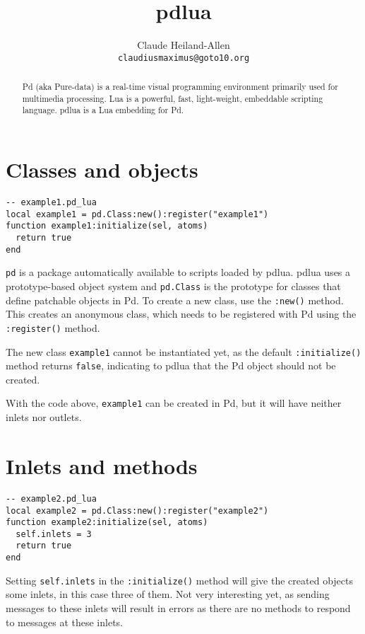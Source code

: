 \documentclass{article}
\title{pdlua}
\author{Claude Heiland-Allen
\\
\tt{claudiusmaximus@goto10.org}}
\begin{document}
\maketitle

\begin{abstract}
Pd (aka Pure-data) is a real-time visual programming environment
primarily used for multimedia processing. Lua is a powerful, fast,
light-weight, embeddable scripting language. pdlua is a Lua embedding
for Pd.
\end{abstract}

\section{Classes and objects}

\begin{verbatim}
-- example1.pd_lua
local example1 = pd.Class:new():register("example1")
function example1:initialize(sel, atoms)
  return true
end
\end{verbatim}

{\tt pd} is a package automatically available to scripts loaded by pdlua.
pdlua uses a prototype-based object system and {\tt pd.Class} is the
prototype for classes that define patchable objects in Pd.  To create a
new class, use the {\tt :new()} method.  This creates an anonymous class,
which needs to be registered with Pd using the {\tt :register()} method.

The new class {\tt example1} cannot be instantiated yet, as the default
{\tt :initialize()} method returns {\tt false}, indicating to pdlua that
the Pd object should not be created.

With the code above, {\tt example1} can be created in Pd, but it will
have neither inlets nor outlets.

\section{Inlets and methods}

\begin{verbatim}
-- example2.pd_lua
local example2 = pd.Class:new():register("example2")
function example2:initialize(sel, atoms)
  self.inlets = 3
  return true
end
\end{verbatim}

Setting {\tt self.inlets} in the {\tt :initialize()} method will give
the created objects some inlets, in this case three of them.  Not very
interesting yet, as sending messages to these inlets will result in
errors as there are no methods to respond to messages at these inlets.
\end{document}
